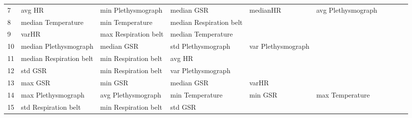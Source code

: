 \begin{landscape}
\begin{table}[]
\begin{tabular}{l|llllllll}
7        & avg HR                  & min Plethysmograph      & median GSR              & medianHR                & avg Plethysmograph      &                       &                         &                         &                         &         \\
8        & median Temperature      & min Temperature         & median Respiration belt &                         &                         &                       &                         &                         &                         &         \\
9        & varHR                   & max Respiration belt    & median Temperature      &                         &                         &                       &                         &                         &                         &         \\
10       & median Plethysmograph   & median GSR              & std Plethysmograph      & var Plethysmograph      &                         &                       &                         &                         &                         &         \\
11       & median Respiration belt & min Respiration belt    & avg HR                  &                         &                         &                       &                         &                         &                         &         \\
12       & std GSR                 & min Respiration belt    & var Plethysmograph      &                         &                         &                       &                         &                         &                         &         \\
13       & max GSR                 & min GSR                 & median GSR              & varHR                   &                         &                       &                         &                         &                         &         \\
14       & max Plethysmograph      & avg Plethysmograph      & min Temperature         & min GSR                 & max Temperature         &                       &                         &                         &                         &         \\
15       & std Respiration belt    & min Respiration belt    & std GSR                 &                         &                         &                       &                         &                         &                         &         \\

\end{tabular}
\end{table}
\end{landscape}
